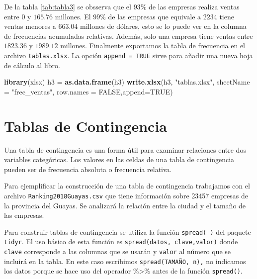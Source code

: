 \documentclass[letterpaper,]{book}
\newenvironment{Shaded}{\begin{snugshade}}{\end{snugshade}}
\newcommand{\DataTypeTok}[1]{\textcolor[rgb]{0.13,0.29,0.53}{#1}}
\newcommand{\KeywordTok}[1]{\textcolor[rgb]{0.13,0.29,0.53}{\textbf{#1}}}
\newcommand{\NormalTok}[1]{#1}
\newcommand{\OtherTok}[1]{\textcolor[rgb]{0.56,0.35,0.01}{#1}}
\newcommand{\StringTok}[1]{\textcolor[rgb]{0.31,0.60,0.02}{#1}}
\begin{document}
De la tabla \ref{tab:tabla3} se obsserva que el \(93\%\) de las empresas realiza ventas entre 0 y \(165.76\) millones. El \(99\%\) de las empresas que equivale a \(2234\) tiene ventas menores a \(663.04\) millones de dólares, esto se lo puede ver en la columna de frecuencias acumuladas relativas. Además, solo una empresa tiene ventas entre \(1823.36\) y \(1989.12\) millones. Finalmente exportamos la tabla de frecuencia en el archivo \texttt{tablas.xlsx}. La opción \texttt{append\ =\ TRUE} sirve para añadir una nueva hoja de cálculo al libro.

\begin{Shaded}
\begin{Highlighting}[]
\KeywordTok{library}\NormalTok{(xlsx)}
\NormalTok{h3 =}\StringTok{ }\KeywordTok{as.data.frame}\NormalTok{(h3)}
\KeywordTok{write.xlsx}\NormalTok{(h3, }\StringTok{"tablas.xlsx"}\NormalTok{, }\DataTypeTok{sheetName =} \StringTok{"frec_ventas"}\NormalTok{, }\DataTypeTok{row.names =} \OtherTok{FALSE}\NormalTok{,}\DataTypeTok{append=}\OtherTok{TRUE}\NormalTok{)}
\end{Highlighting}
\end{Shaded}

\hypertarget{tablas-de-contingencia}{%
\section{Tablas de Contingencia}\label{tablas-de-contingencia}}

Una tabla de contingencia es una forma útil para examinar relaciones entre dos variables categóricas. Los valores en las celdas de una tabla de contingencia pueden ser de frecuencia absoluta o frecuencia relativa.

Para ejemplificar la construcción de una tabla de contingencia trabajamos con el archivo \texttt{Ranking2018Guayas.csv} que tiene información sobre 23457 empresas de la provincia del Guayas. Se analizará la relación entre la ciudad y el tamaño de las empresas.

Para construir tablas de contingencia se utiliza la función \texttt{spread(\ )} del paquete \texttt{tidyr}. El uso básico de esta función es \texttt{spread(datos,\ clave,valor)} donde \texttt{clave} corresponde a las columnas que se usarán y \texttt{valor} al número que se incluirá en la tabla. En este caso escribimos \texttt{spread(TAMAÑO,\ n),} no indicamos los datos porque se hace uso del operador \%\textgreater{}\% antes de la función \texttt{spread()}.
\end{document}
